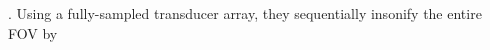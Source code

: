 \cite[Sect. 1.11]{book:Szabo2013}.
Using
a fully-sampled transducer array,
they sequentially insonify
the entire \ac{FOV} by
